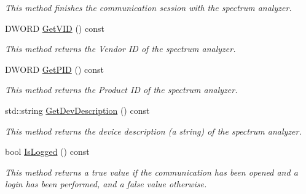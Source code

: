 \begin{DoxyCompactItemize}
\begin{DoxyCompactList}\small\item\em This method finishes the communication session with the spectrum analyzer. \end{DoxyCompactList}\item 
\mbox{\label{classSpectranInterface_a7c7d78879a60f850b866386ad6101e20}} 
D\+W\+O\+RD \hyperlink{classSpectranInterface_a7c7d78879a60f850b866386ad6101e20}{Get\+V\+ID} () const
\begin{DoxyCompactList}\small\item\em This method returns the Vendor ID of the spectrum analyzer. \end{DoxyCompactList}\item 
\mbox{\label{classSpectranInterface_a70e03dced69c7c7c60951692894d26ce}} 
D\+W\+O\+RD \hyperlink{classSpectranInterface_a70e03dced69c7c7c60951692894d26ce}{Get\+P\+ID} () const
\begin{DoxyCompactList}\small\item\em This method returns the Product ID of the spectrum analyzer. \end{DoxyCompactList}\item 
\mbox{\label{classSpectranInterface_a37854d2e596c8338c0015d8ec9120cae}} 
std\+::string \hyperlink{classSpectranInterface_a37854d2e596c8338c0015d8ec9120cae}{Get\+Dev\+Description} () const
\begin{DoxyCompactList}\small\item\em This method returns the device description (a string) of the spectrum analyzer. \end{DoxyCompactList}\item 
\mbox{\label{classSpectranInterface_a7e80df1d7f5709f2976847ee1c91a85d}} 
bool \hyperlink{classSpectranInterface_a7e80df1d7f5709f2976847ee1c91a85d}{Is\+Logged} () const
\begin{DoxyCompactList}\small\item\em This method returns a true value if the communication has been opened and a login has been performed, and a false value otherwise. \end{DoxyCompactList}\item 
\mbox{\label{classSpectranInterface_ad921e08380e246d03d01b4ad080cec99}} 

\end{DoxyCompactItemize}
